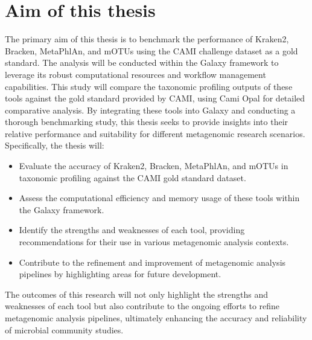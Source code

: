 \section{Aim of this thesis}\label{aim_of_thesis}
The primary aim of this thesis is to benchmark the performance of Kraken2, Bracken, MetaPhlAn, and mOTUs using the CAMI challenge dataset as a gold standard. 
The analysis will be conducted within the Galaxy framework to leverage its robust computational resources and workflow management capabilities. 
This study will compare the taxonomic profiling outputs of these tools against the gold standard provided by CAMI, using Cami Opal for detailed comparative analysis.
By integrating these tools into Galaxy and conducting a thorough benchmarking study, 
this thesis seeks to provide insights into their relative performance and suitability for different metagenomic research scenarios. Specifically, the thesis will:
\begin{itemize}
    \item Evaluate the accuracy of Kraken2, Bracken, MetaPhlAn, and mOTUs in taxonomic profiling against the CAMI gold standard dataset.
    \item Assess the computational efficiency and memory usage of these tools within the Galaxy framework.
    \item Identify the strengths and weaknesses of each tool, providing recommendations for their use in various metagenomic analysis contexts.
    \item Contribute to the refinement and improvement of metagenomic analysis pipelines by highlighting areas for future development.
\end{itemize}
The outcomes of this research will not only highlight the strengths and weaknesses of
each tool but also contribute to the ongoing efforts to refine metagenomic analysis pipelines, 
ultimately enhancing the accuracy and reliability of microbial community studies.